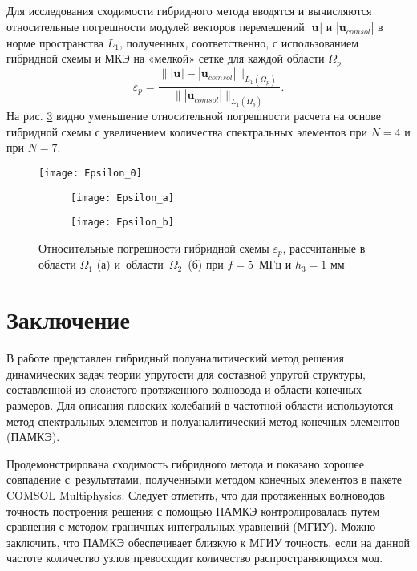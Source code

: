 \documentclass[press]{vestnik}
\begin{document}
Для исследования сходимости гибридного метода вводятся и вычисляются относительные погрешности модулей векторов перемещений $|{\bm{u_{}^{}}}|$ и $|{\bm{u}}_{comsol}^{}|$ в норме пространства $L_{1}$, полученных, соответственно, с использованием гибридной схемы и МКЭ на «мелкой» сетке для каждой области $\Omega_{p}$
$$
\varepsilon_{p} = \frac{\parallel |{\bm{u_{}^{}}}|-|{\bm{u}}_{comsol}^{}| \parallel_{L_{1}^{}(\Omega_{p})}^{}}{\parallel |{\bm{u}}_{comsol}^{}| \parallel_{L_{1}^{}(\Omega_{p})}^{}}.
$$
На рис. \ref{eps_p} видно уменьшение относительной погрешности расчета на основе гибридной схемы с увеличением количества спектральных элементов при $N=4$ и при $N=7$.
\begin{figure}
	\centering
	\texttt{[image: Epsilon\_0]}\\
	\begin{subfigure}{.49\textwidth}
		\texttt{[image: Epsilon\_a]}
		\caption{}\label{eps_pa}
	\end{subfigure}
	\begin{subfigure}{.49\textwidth}
		\texttt{[image: Epsilon\_b]}
		\caption{}\label{eps_pb}
	\end{subfigure}		 
		\caption{Относительные погрешности гибридной схемы $\varepsilon_{p}$, рассчитанные в области $\Omega_{1}$ (а) и~области~$\Omega_{2}$~(б) при $f= 5$~МГц и $h_{3}=1$ мм} 
		\label{eps_p}
\end{figure}


\section*{Заключение}
В работе представлен гибридный полуаналитический метод решения динамических задач теории упругости для составной упругой структуры, составленной из слоистого протяженного волновода и области конечных размеров. Для описания плоских колебаний в частотной области используются метод спектральных элементов и полуаналитический метод конечных элементов (ПАМКЭ).

Продемонстрирована сходимость гибридного метода и показано хорошее совпадение с~результатами, полученными методом конечных элементов в пакете COMSOL Multiphysics\textsuperscript\textregistered. Следует отметить, что для протяженных волноводов точность построения решения с помощью ПАМКЭ контролировалась путем сравнения с методом граничных интегральных уравнений (МГИУ). Можно заключить, что ПАМКЭ обеспечивает близкую к МГИУ точность, если на данной частоте количество узлов превосходит количество распространяющихся мод.
\end{document}
